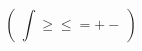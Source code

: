 \documentclass[9pt]{article}
\begin{document}
\begin{equation*}
  \left(\ \int \ge \le = + - \ \right)
\end{equation*}
\end{document}

